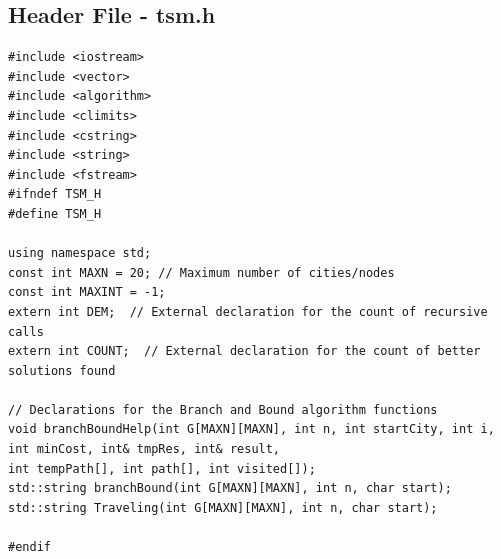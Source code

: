 \documentclass[a4paper]{article}
\begin{document}
\subsection{Header File - tsm.h}
\begin{verbatim}
#include <iostream>
#include <vector>
#include <algorithm>
#include <climits>
#include <cstring>
#include <string>
#include <fstream>
#ifndef TSM_H
#define TSM_H

using namespace std;
const int MAXN = 20; // Maximum number of cities/nodes
const int MAXINT = -1;
extern int DEM;  // External declaration for the count of recursive calls
extern int COUNT;  // External declaration for the count of better solutions found

// Declarations for the Branch and Bound algorithm functions
void branchBoundHelp(int G[MAXN][MAXN], int n, int startCity, int i, int minCost, int& tmpRes, int& result, 
int tempPath[], int path[], int visited[]);
std::string branchBound(int G[MAXN][MAXN], int n, char start);
std::string Traveling(int G[MAXN][MAXN], int n, char start);

#endif
\end{verbatim}
\end{document}
